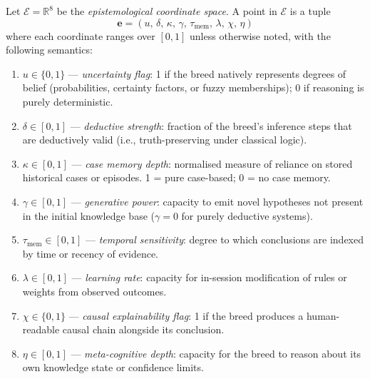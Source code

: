 \begin{definition}
\label{def:epistemological-coordinates}
Let $\mathcal{E} = \mathbb{R}^8$ be the \emph{epistemological coordinate space}. A point
in $\mathcal{E}$ is a tuple
\[
  \mathbf{e} = (u,\, \delta,\, \kappa,\, \gamma,\, \tau_{\mathrm{mem}},\, \lambda,\, \chi,\, \eta)
\]
where each coordinate ranges over $[0,1]$ unless otherwise noted, with the following
semantics:

\begin{enumerate}
  \item $u \in \{0,1\}$ — \emph{uncertainty flag}: 1 if the breed natively represents
        degrees of belief (probabilities, certainty factors, or fuzzy memberships);
        0 if reasoning is purely deterministic.

  \item $\delta \in [0,1]$ — \emph{deductive strength}: fraction of the breed's
        inference steps that are deductively valid (i.e., truth-preserving under classical
        logic).

  \item $\kappa \in [0,1]$ — \emph{case memory depth}: normalised measure of reliance
        on stored historical cases or episodes. 1 = pure case-based; 0 = no case memory.

  \item $\gamma \in [0,1]$ — \emph{generative power}: capacity to emit novel hypotheses
        not present in the initial knowledge base ($\gamma = 0$ for purely deductive
        systems).

  \item $\tau_{\mathrm{mem}} \in [0,1]$ — \emph{temporal sensitivity}: degree to which
        conclusions are indexed by time or recency of evidence.

  \item $\lambda \in [0,1]$ — \emph{learning rate}: capacity for in-session modification
        of rules or weights from observed outcomes.

  \item $\chi \in \{0,1\}$ — \emph{causal explainability flag}: 1 if the breed produces
        a human-readable causal chain alongside its conclusion.

  \item $\eta \in [0,1]$ — \emph{meta-cognitive depth}: capacity for the breed to
        reason about its own knowledge state or confidence limits.
\end{enumerate}
\end{definition}

